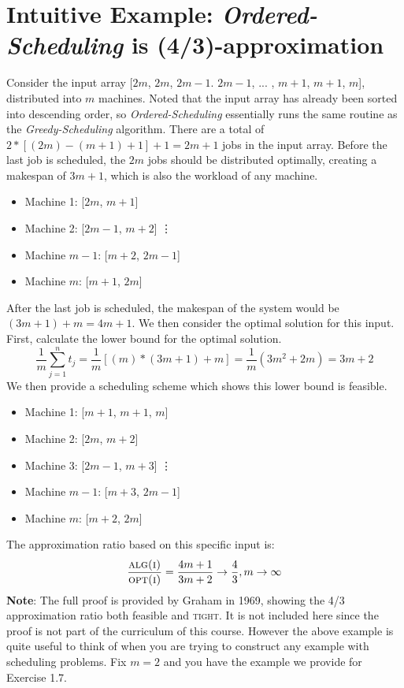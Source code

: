 \documentclass[11pt]{article}
\begin{document}
\section*{Intuitive Example: \textit{Ordered-Scheduling} is (4/3)-approximation}
Consider the input array [$2m$, $2m$, $2m-1$. $2m-1$, ... , $m+1$, $m+1$, $m$], distributed into $m$ machines. 
Noted that the input array has already been sorted into descending order, so \textit{Ordered-Scheduling} essentially runs the same routine 
as the \textit{Greedy-Scheduling} algorithm. There are a total of $2*[(2m)-(m+1)+1]+1=2m+1$ jobs in the input array.
\newline
Before the last job is scheduled, the $2m$ jobs should be distributed optimally, creating a makespan of $3m + 1$, which is also the workload of any machine. 
\begin{itemize}
  \item Machine 1: [$2m$, $m+1$]
  \item Machine 2: [$2m-1$, $m+2$]
  \newline \vdots
  \item Machine $m-1$: [$m+2$, $2m-1$]
  \item Machine $m$: [$m+1$, $2m$]
\end{itemize}
After the last job is scheduled, the makespan of the system would be $(3m+1)+m=4m+1$. 
\newline
We then consider the optimal solution for this input. First, calculate the lower bound for the optimal solution.
\[
\frac{1}{m} \sum_{j=1}^{n}{t}_{j} = \frac{1}{m}[(m)*(3m+1)+m] = \frac{1}{m}(3m^2+2m)=3m+2
\] 
We then provide a scheduling scheme which shows this lower bound is feasible. 
\begin{itemize}
  \item Machine 1: [$m+1$, $m+1$, $m$]
  \item Machine 2: [$2m$, $m+2$]
  \item Machine 3: [$2m-1$, $m+3$]
  \newline \vdots
  \item Machine $m-1$: [$m+3$, $2m-1$]
  \item Machine $m$: [$m+2$, $2m$]
\end{itemize}
The approximation ratio based on this specific input is:
\[
\frac{\textsc{alg(i)}}{\textsc{opt(i)}}=\frac{4m+1}{3m+2} \rightarrow \frac{4}{3} , m \rightarrow \infty
\]
\textbf{Note}: The full proof is provided by Graham in 1969, showing the 4/3 approximation ratio both feasible and \textsc{tight}. 
It is not included here since the proof is not part of the curriculum of this course. However the above example is quite useful to think
of when you are trying to construct any example with scheduling problems. Fix $m=2$ and you have the example we provide for Exercise 1.7. 
\end{document}
